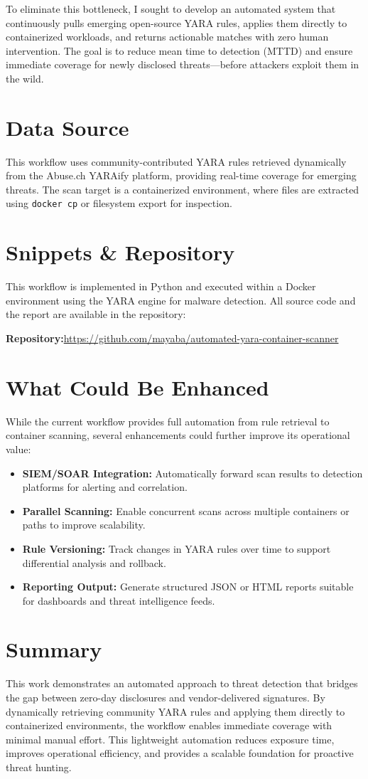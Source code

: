 \documentclass[conference]{IEEEtran}
\begin{document}
To eliminate this bottleneck, I sought to develop an automated system that continuously pulls emerging open-source YARA rules, applies them directly to containerized workloads, and returns actionable matches with zero human intervention. The goal is to reduce mean time to detection (MTTD) and ensure immediate coverage for newly disclosed threats—before attackers exploit them in the wild.

\section{Data Source}
This workflow uses community-contributed YARA rules retrieved dynamically from the Abuse.ch YARAify platform, providing real-time coverage for emerging threats. The scan target is a containerized environment, where files are extracted using \texttt{docker cp} or filesystem export for inspection.

\section{Snippets \& Repository}
This workflow is implemented in Python and executed within a Docker environment using the YARA engine for malware detection. All source code and the report are available in the repository:

\textbf{Repository:}\url{https://github.com/mayaba/automated-yara-container-scanner}

\section{What Could Be Enhanced}
While the current workflow provides full automation from rule retrieval to container scanning, several enhancements could further improve its operational value:
\begin{itemize}
    \item \textbf{SIEM/SOAR Integration:} Automatically forward scan results to detection platforms for alerting and correlation.
    \item \textbf{Parallel Scanning:} Enable concurrent scans across multiple containers or paths to improve scalability.
    \item \textbf{Rule Versioning:} Track changes in YARA rules over time to support differential analysis and rollback.
    \item \textbf{Reporting Output:} Generate structured JSON or HTML reports suitable for dashboards and threat intelligence feeds.
\end{itemize}

\section{Summary}
This work demonstrates an automated approach to threat detection that bridges the gap between zero-day disclosures and vendor-delivered signatures. By dynamically retrieving community YARA rules and applying them directly to containerized environments, the workflow enables immediate coverage with minimal manual effort. This lightweight automation reduces exposure time, improves operational efficiency, and provides a scalable foundation for proactive threat hunting.
\end{document}
